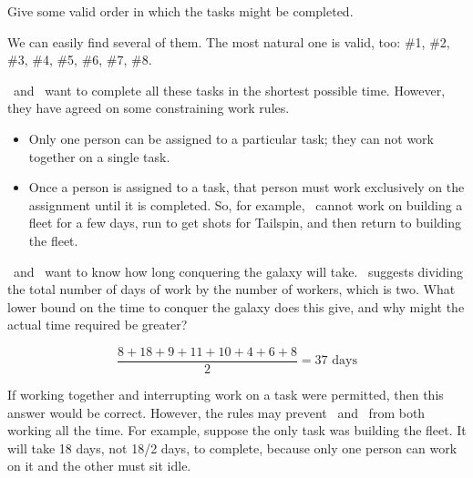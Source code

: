 \begin{problem}
\bparts

\ppart Give some valid order in which the tasks might be completed.

\begin{solution}
We can easily find several of them. The most natural one is valid, too:
\#1, \#2, \#3, \#4, \#5, \#6, \#7, \#8.

\end{solution}
\eparts

\Jay\  and \Rongrong\  want to complete all these tasks in the
shortest possible time. However, they have agreed on some constraining
work rules.
\begin{itemize}

\item Only one person can be assigned to a particular task; they can
not work together on a single task.

\item Once a person is assigned to a task, that person must work
exclusively on the assignment until it is completed.  So, for example,
\Jay\  cannot work on building a fleet for a few days, run to get shots
for Tailspin, and then return to building the fleet.

\end{itemize}


\bparts

\ppart \Jay\  and \Rongrong\  want to know how long conquering the
galaxy will take.  \Rongrong\  suggests dividing the total number of days of
work by the number of workers, which is two.  What lower bound on the time
to conquer the galaxy does this give, and why might the actual time
required be greater?

\begin{solution}
\begin{equation*}
\frac{8 + 18 + 9 + 11 + 10 + 4 + 6 + 8}{2} = 37 \text{ days}
\end{equation*}

If working together and interrupting work on a task were permitted, then
this answer would be correct.  However, the rules may prevent \Jay\  and
\Rongrong\  from both working all the time.  For example, suppose the only task
was building the fleet.  It will take 18 days, not 18/2 days, to complete,
because only one person can work on it and the other must sit idle.
\end{solution}


\end{problem}
